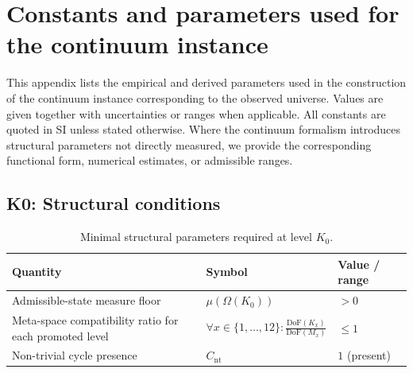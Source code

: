 
\section{Constants and parameters used for the continuum instance}
\label{app:synthesis-constants-and-parameters}

This appendix lists the empirical and derived parameters used in the construction 
of the continuum instance corresponding to the observed universe. 
Values are given together with uncertainties or ranges when applicable. 
All constants are quoted in SI unless stated otherwise. 
Where the continuum formalism introduces structural parameters not directly 
measured, we provide the corresponding functional form, numerical estimates, 
or admissible ranges.



\subsection*{K0: Structural conditions}

\begin{table}[htbp]
  \centering
  \caption{Minimal structural parameters required at level \(K_0\).}
  \label{tab:k0-structural-parameters}
\begin{tabular}{@{}L{0.44\textwidth}L{0.16\textwidth}L{0.23\textwidth}@{}}
    \hline
    Quantity & Symbol & Value / range \\
    \hline
    Admissible-state measure floor & \(\mu(\Omega(K_0))\)
        & \(> 0\) \\
    Meta-space compatibility ratio for each promoted level & \(\forall x \in \{1,\dots,12\}: \frac{\mathrm{DoF}(K_x)}{\mathrm{DoF}(M_x)}\)
        & \(\leq 1\) \\
    Non-trivial cycle presence & \(C_{\mathrm{nt}}\)
        & \(1\) (present) \\
    \hline
\end{tabular}
\end{table}

